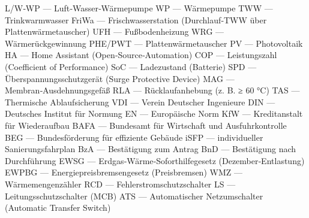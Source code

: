 \markdownRendererDocumentBegin
\markdownRendererUlBeginTight
\markdownRendererUlItem L/W‑WP — Luft‑Wasser‑Wärmepumpe\markdownRendererUlItemEnd 
\markdownRendererUlItem WP — Wärmepumpe\markdownRendererUlItemEnd 
\markdownRendererUlItem TWW — Trinkwarmwasser\markdownRendererUlItemEnd 
\markdownRendererUlItem FriWa — Frischwasserstation (Durchlauf‑TWW über Plattenwärmetauscher)\markdownRendererUlItemEnd 
\markdownRendererUlItem UFH — Fußbodenheizung\markdownRendererUlItemEnd 
\markdownRendererUlItem WRG — Wärmerückgewinnung\markdownRendererUlItemEnd 
\markdownRendererUlItem PHE/PWT — Plattenwärmetauscher\markdownRendererUlItemEnd 
\markdownRendererUlItem PV — Photovoltaik\markdownRendererUlItemEnd 
\markdownRendererUlItem HA — Home Assistant (Open‑Source‑Automation)\markdownRendererUlItemEnd 
\markdownRendererUlItem COP — Leistungszahl (Coefficient of Performance)\markdownRendererUlItemEnd 
\markdownRendererUlItem SoC — Ladezustand (Batterie)\markdownRendererUlItemEnd 
\markdownRendererUlItem SPD — Überspannungsschutzgerät (Surge Protective Device)\markdownRendererUlItemEnd 
\markdownRendererUlItem MAG — Membran‑Ausdehnungsgefäß\markdownRendererUlItemEnd 
\markdownRendererUlItem RLA — Rücklaufanhebung (z. B. ≥ 60 °C)\markdownRendererUlItemEnd 
\markdownRendererUlItem TAS — Thermische Ablaufsicherung\markdownRendererUlItemEnd 
\markdownRendererUlItem VDI — Verein Deutscher Ingenieure\markdownRendererUlItemEnd 
\markdownRendererUlItem DIN — Deutsches Institut für Normung\markdownRendererUlItemEnd 
\markdownRendererUlItem EN — Europäische Norm\markdownRendererUlItemEnd 
\markdownRendererUlItem KfW — Kreditanstalt für Wiederaufbau\markdownRendererUlItemEnd 
\markdownRendererUlItem BAFA — Bundesamt für Wirtschaft und Ausfuhrkontrolle\markdownRendererUlItemEnd 
\markdownRendererUlItem BEG — Bundesförderung für effiziente Gebäude\markdownRendererUlItemEnd 
\markdownRendererUlItem iSFP — individueller Sanierungsfahrplan\markdownRendererUlItemEnd 
\markdownRendererUlItem BzA — Bestätigung zum Antrag\markdownRendererUlItemEnd 
\markdownRendererUlItem BnD — Bestätigung nach Durchführung\markdownRendererUlItemEnd 
\markdownRendererUlItem EWSG — Erdgas‑Wärme‑Soforthilfegesetz (Dezember‑Entlastung)\markdownRendererUlItemEnd 
\markdownRendererUlItem EWPBG — Energiepreisbremsengesetz (Preisbremsen)\markdownRendererUlItemEnd 
\markdownRendererUlItem WMZ — Wärmemengenzähler\markdownRendererUlItemEnd 
\markdownRendererUlItem RCD — Fehlerstromschutzschalter\markdownRendererUlItemEnd 
\markdownRendererUlItem LS — Leitungsschutzschalter (MCB)\markdownRendererUlItemEnd 
\markdownRendererUlItem ATS — Automatischer Netzumschalter (Automatic Transfer Switch)\markdownRendererUlItemEnd 
\markdownRendererUlEndTight \markdownRendererDocumentEnd